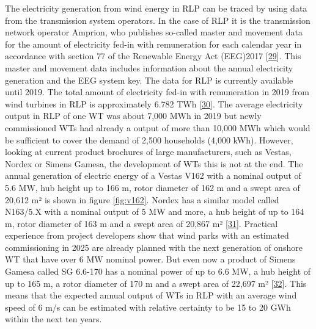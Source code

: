 \documentclass[a4paper,11pt]{article}
\begin{document}
The electricity generation from wind energy in RLP can be traced by using data from the transmission system operators. In the case of RLP it is the transmission network operator Amprion, who publishes so-called master and movement data for the amount of electricity fed-in with remuneration for each calendar year in accordance with section 77 of the Renewable Energy Act (EEG)2017 {[}\protect\hyperlink{ref-Bundesgestzblatt.2017}{29}{]}. This master and movement data includes information about the annual electricity generation and the EEG system key. The data for RLP is currently available until 2019. The total amount of electricity fed-in with remuneration in 2019 from wind turbines in RLP is approximately 6.782 TWh {[}\protect\hyperlink{ref-EnergieagenturRheinlandPfalz.2019}{30}{]}. The average electricity output in RLP of one WT was about 7,000 MWh in 2019 but newly commissioned WTs had already a output of more than 10,000 MWh which would be sufficient to cover the demand of 2,500 households (4,000 kWh). However, looking at current product brochures of large manufacturers, such as Vestas, Nordex or Simens Gamesa, the development of WTs this is not at the end. The annual generation of electric energy of a Vestas V162 with a nominal output of 5.6 MW, hub height up to 166 m, rotor diameter of 162 m and a swept area of 20,612 m² is shown in figure \ref{fig:v162}. Nordex has a similar model called N163/5.X with a nominal output of 5 MW and more, a hub height of up to 164 m, rotor diameter of 163 m and a swept area of 20,867 m² {[}\protect\hyperlink{ref-Nordex.2021}{31}{]}. Practical experience from project developers show that wind parks with an estimated commissioning in 2025 are already planned with the next generation of onshore WT that have over 6 MW nominal power. But even now a product of Simens Gamesa called SG 6.6-170 has a nominal power of up to 6.6 MW, a hub height of up to 165 m, a rotor diameter of 170 m and a swept area of 22,697 m² {[}\protect\hyperlink{ref-SimensGamesa.2021}{32}{]}. This means that the expected annual output of WTs in RLP with an average wind speed of 6 m/s can be estimated with relative certainty to be 15 to 20 GWh within the next ten years.
\end{document}
